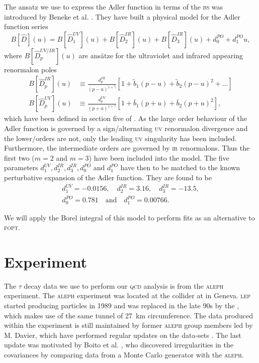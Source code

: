 \documentclass[../../index.tex]{subfiles}
\begin{document}
The ansatz we use to express the Adler function in terms of the \textsc{bs} was
introduced by Beneke et al. \cite{Beneke2008}. They have built a physical model
for the Adler function series
\begin{equation}
  \label{eq:borelModel}
  B[\widehat D](u) = B[\widehat D_1^{UV}](u) + B[\widehat D_2^{IR}](u) + B[\widehat D_3^{IR}](u) + d_0^{PO} + d_1^{PO}u,
\end{equation}
where \(B[\widehat D_p^{UV/IR}](u)\) are ansätze for the ultraviolet and
infrared appearing renormalon poles
\begin{align}
  B[\widehat D_p^{IR}](u)
  &\equiv \frac{d_p^{IR}}{(p-u)^{1+\tilde \gamma}}
    \left[  1 + \tilde b_1(p-u) + \tilde b_2(p-u)^2 + \dots \right] \\
  B[\widehat D_p^{UV}](u) &\equiv \frac{d_p^{UV}}{(p+u)^{1+\bar\gamma}}\left[1 + \bar b_1(p+u) + \bar b_2(p+u)^2 \right],
\end{align}
which have been defined in section five of \cite{Beneke2008}. As the large order
behaviour of the Adler function is governed by a sign\-/alternating \textsc{uv}
renormalon divergence and the lower\-/orders are not, only the leading
\textsc{uv} singularity has been included. Furthermore, the intermediate orders
are governed by \textsc{ir} renormalons. Thus the first two (\(m=2\) and
\(m=3\)) have been included into the model. The five parameters \(d_1^{UV},
d_2^{IR}, d_3^{IR}, d_0^{PO}\) and \(d_1^{PO}\) have then to be matched to the
known perturbative expansion of the Adler function. They are found to be
\cite{Beneke2008}
\begin{equation}
  \begin{split}
    d_1^{UV} = -0.0156, \quad d_2^{IR} = 3.16, \quad d_3^{IR} = -13.5, \\
    d_0^{PO} = 0.781 \quad \text{and} \quad d_1^{PO} = 0.00766.
  \end{split}
\end{equation}

We will apply the Borel integral of this model to perform fits as an alternative
to \textsc{fopt}. 



\section{Experiment}
The \(\tau\) decay data we use to perform our \textsc{qcd} analysis is from the
\textsc{aleph} experiment. The \textsc{aleph} experiment was located at the
 collider at  in Geneva. \textsc{lep} started producing
particles in 1989 and was replaced in the late 90s by the
, which makes use of the same tunnel of
\SI{27}{\kilo\meter} circumference. The data produced within the experiment is
still maintained by former \textsc{aleph} group members led by M. Davier, which
have performed regular updates on the data-sets
\cite{Davier2013,Davier2008,Aleph2005}. The last update was motivated by Boito
et al. \cite{Boito2010}, who discovered irregularities in the covariances by
comparing data from a Monte Carlo generator with the \textsc{aleph}.
\end{document}
